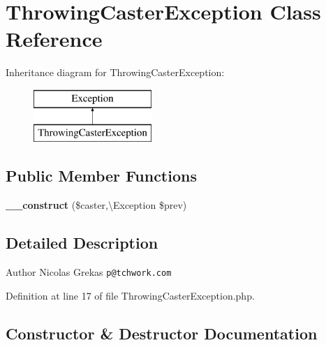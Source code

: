 \section{Throwing\+Caster\+Exception Class Reference}
\label{class_symfony_1_1_component_1_1_var_dumper_1_1_exception_1_1_throwing_caster_exception}
Inheritance diagram for Throwing\+Caster\+Exception\+:\begin{figure}[H]
\begin{center}
\leavevmode
\includegraphics[height=2.000000cm]{class_symfony_1_1_component_1_1_var_dumper_1_1_exception_1_1_throwing_caster_exception}
\end{center}
\end{figure}
\subsection*{Public Member Functions}
\begin{DoxyCompactItemize}
\item 
{\bf \+\_\+\+\_\+construct} (\$caster,\textbackslash{}Exception \$prev)
\end{DoxyCompactItemize}


\subsection{Detailed Description}
\begin{DoxyAuthor}{Author}
Nicolas Grekas {\tt p@tchwork.\+com} 
\end{DoxyAuthor}


Definition at line 17 of file Throwing\+Caster\+Exception.\+php.



\subsection{Constructor \& Destructor Documentation}
